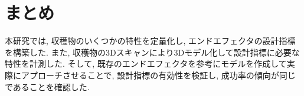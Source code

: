 \section{まとめ}
本研究では, 収穫物のいくつかの特性を定量化し, エンドエフェクタの設計指標を構築した.
また, 収穫物の3Dスキャンにより3Dモデル化して設計指標に必要な特性を計測した.
そして, 既存のエンドエフェクタを参考にモデルを作成して実際にアプローチさせることで, 設計指標の有効性を検証し, 成功率の傾向が同じであることを確認した.
